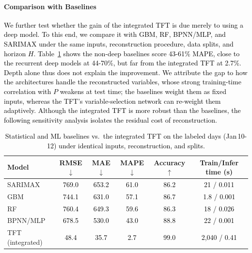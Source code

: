 \documentclass[final,10pt,1p,authoryear]{elsarticle}
\theoremstyle{definition}
\begin{document}
\paragraph{Comparison with Baselines}
\textcolor{black}{We further test whether the gain of the integrated TFT is due merely to using a deep model. To this end, we compare it with GBM, RF, BPNN/MLP, and SARIMAX under the same inputs, reconstruction procedure, data splits, and horizon $H$. Table~\ref{tab:baselines} shows the non-deep baselines score 43-61\% MAPE, close to the recurrent deep models at 44-70\%, but far from the integrated TFT at 2.7\%. Depth alone thus does not explain the improvement. We attribute the gap to how the architectures handle the reconstructed variables, whose strong training-time correlation with $P$ weakens at test time; the baselines weight them as fixed inputs, whereas the TFT's variable-selection network can re-weight them adaptively. Although the integrated TFT is more robust than the baselines, the following sensitivity analysis isolates the residual cost of reconstruction.}
\begin{table}[!htbp]
\centering
\caption{\textcolor{black}{Statistical and ML baselines vs.\ the integrated TFT on the labeled days (Jan\,10-12) under identical inputs, reconstruction, and splits.}}
\label{tab:baselines}
\begin{tabular}{lccccc}\toprule
Model & RMSE$\downarrow$ & MAE$\downarrow$ & MAPE$\downarrow$ & Accuracy$\uparrow$ & Train/Infer time (s)\\
\midrule
SARIMAX & \textcolor{black}{769.0} & \textcolor{black}{653.2} & \textcolor{black}{61.0} & \textcolor{black}{86.2} & \textcolor{black}{21 / 0.011} \\
GBM & \textcolor{black}{744.1} & \textcolor{black}{631.0} & \textcolor{black}{57.1} & \textcolor{black}{86.7} & \textcolor{black}{1.8 / 0.001} \\
RF & \textcolor{black}{760.4} & \textcolor{black}{649.3} & \textcolor{black}{59.6} & \textcolor{black}{86.3} & \textcolor{black}{18 / 0.026} \\
BPNN/MLP & \textcolor{black}{678.5} & \textcolor{black}{530.0} & \textcolor{black}{43.0} & \textcolor{black}{88.8} & \textcolor{black}{22 / 0.001} \\
TFT (integrated) & \textcolor{black}{48.4} & \textcolor{black}{35.7} & \textcolor{black}{2.7} & \textcolor{black}{99.0} & \textcolor{black}{2,040 / 0.41} \\
\bottomrule
\end{tabular}
\end{table}
\end{document}
